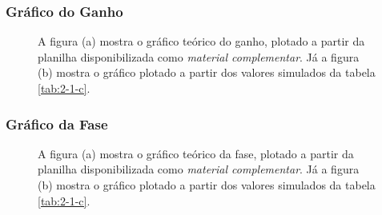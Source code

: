 \documentclass[11pt]{article}
\begin{document}
\subsubsection*{Gráfico do Ganho}

\begin{figure}[h!]
  \centering
  \qquad
  \caption{A figura (a) mostra o gráfico teórico do ganho, plotado a partir da planilha disponibilizada como \emph{material complementar}. Já a figura (b) mostra o gráfico plotado a partir dos valores simulados da tabela \ref{tab:2-1-c}.}
\end{figure}

\pagebreak

\subsubsection*{Gráfico da Fase}

\begin{figure}[h!]
  \centering
  \qquad
  \caption{A figura (a) mostra o gráfico teórico da fase, plotado a partir da planilha disponibilizada como \emph{material complementar}. Já a figura (b) mostra o gráfico plotado a partir dos valores simulados da tabela \ref{tab:2-1-c}.}
\end{figure}
\end{document}
